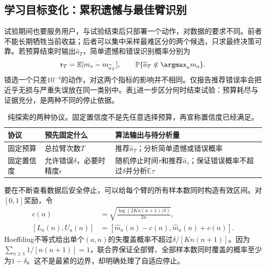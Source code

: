 \subsection{学习目标变化：累积遗憾与最佳臂识别}
\label{sec:rl-learning-best-arm}

试验期间也要服务用户，与试验结束后只部署一个动作，对数据的要求不同。前者不能长期牺牲当前收益；后者可以集中采样最难区分的两个候选，只求最终决策可靠。若预算结束时输出$\widehat a_T$，简单遗憾和错误识别概率分别为
\begin{equation}
  \mathfrak r_T=\mathbb E[m_*-m_{\widehat a_T}],
  \qquad
  \mathbb P\{\widehat a_T\notin\argmax_a m_a\}.
  \label{eq:rl-learning-simple-regret}
\end{equation}
错选一个只差$10^{-4}$的动作，对这两个指标的影响并不相同。仅报告推荐错误率会把近乎无损与严重失误放在同一类别中。表\ref{tab:rl-learning-identification-protocols}进一步区分何时结束试验：预算耗尽与证据充分，是两种不同的停止依据。

\begin{table}[htbp]
  \centering
  \small
  \begin{tabularx}{\linewidth}{>{\raggedright\arraybackslash}p{22mm} >{\raggedright\arraybackslash}X >{\raggedright\arraybackslash}X}
    \toprule
    协议 & 预先固定什么 & 算法输出与待分析量 \\
    \midrule
    固定预算 & 总拉臂次数$T$ & 推荐$\widehat a_T$；分析简单遗憾或错误概率 \\
    固定置信度 & 允许错误$\delta$，必要时精度$\epsilon$ & 随机停止时间$\tau$和推荐$\widehat a_\tau$；保证错误概率不超过$\delta$并分析$\mathbb E\tau$ \\
    \bottomrule
  \end{tabularx}
  \caption{纯探索的两种协议。固定置信度不是先任意选择预算，再宣称置信度已经满足。}
  \label{tab:rl-learning-identification-protocols}
\end{table}

要在不断查看数据后安全停止，可以给每个臂的所有样本数同时构造有效区间。对$[0,1]$奖励，令
\[
  \begin{aligned}
    c(n)&=\sqrt{\frac{\log(2K n(n+1)/\delta)}{2n}},\\
    [L_a(n),U_a(n)]&=[\widehat m_a(n)-c(n),\widehat m_a(n)+c(n)].
  \end{aligned}
\]
Hoeffding不等式给出单个$(a,n)$的失覆盖概率不超过$\delta/[K n(n+1)]$。因为$\sum_{n\geq1}1/[n(n+1)]=1$，联合界保证全部臂、全部样本数同时覆盖的概率至少为$1-\delta$。这不是最紧的边界，却明确处理了自适应停止。


